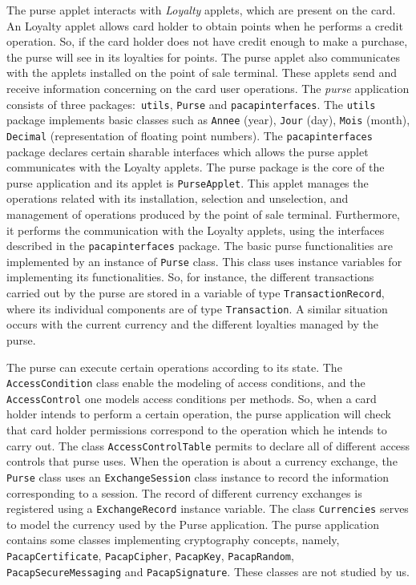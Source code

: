 \documentclass[a4paper]{llncs}
\begin{document}
The purse applet interacts with \textit{Loyalty} applets, which are
present on the card. An Loyalty applet allows card holder to obtain points
when he performs a credit operation. So, if the card holder does not
have credit enough to make a purchase, the purse will see in its loyalties
for points. The purse applet also communicates with the applets installed 
on the point of sale terminal. These applets send and receive information 
concerning on the card user operations. The \textit{purse} application 
consists of three packages$:$ \texttt{utils},
\texttt{Purse} and \texttt{pacapinterfaces}. The {\tt utils} package
implements basic classes such 
as \texttt{Annee} (year), \texttt{Jour} (day), \texttt{Mois}
(month), \texttt{Decimal} (representation of floating point numbers).
The \texttt{pacapinterfaces} package declares certain sharable interfaces
which allows the purse applet communicates with the Loyalty applets.
The purse package is the core of the purse application 
and its
applet is \texttt{PurseApplet}. This applet manages the
operations related with its installation, selection and unselection,
and management of operations produced by the point of sale terminal.
Furthermore, it performs the communication with the Loyalty applets,
using the interfaces described in the \texttt{pacapinterfaces} package. 
The basic purse functionalities
are implemented by an instance of \texttt{Purse} class. This class uses
instance variables for implementing its functionalities. So, for instance,
the different
transactions carried out by the purse are stored in a variable of
type \texttt{TransactionRecord}, where its individual components are
of type \texttt{Transaction}. A similar situation occurs with the
current currency and the different loyalties managed by the purse.

The purse can execute certain operations according to its state.
The \texttt{AccessCondition} class enable the modeling of access
conditions, and the \texttt{AccessControl} one models access conditions
per methods. So, when a card holder intends to perform a certain
operation, the purse application will check that card holder
permissions correspond to the
operation which he intends to carry out. The class
\texttt{AccessControlTable} permits to declare
all of different access controls that purse uses. When the operation is
about a currency exchange, the 
\texttt{Purse} class uses an \texttt{ExchangeSession} class instance to 
record the information corresponding to a session. The record of
different currency exchanges is registered using a
\texttt{ExchangeRecord} instance variable. The class
\texttt{Currencies} serves to model the currency used by the Purse
application. 
The purse application contains some classes implementing cryptography
concepts, namely, \texttt{PacapCertificate},
\texttt{PacapCipher}, \texttt{PacapKey}, \texttt{PacapRandom},
\texttt{PacapSecureMessaging} and \texttt{PacapSignature}. These
classes are not studied by us.
\end{document}
